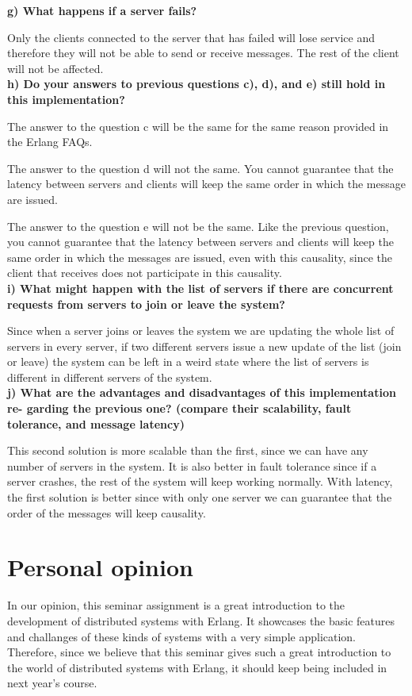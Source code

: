 \documentclass[a4paper, 10pt]{article}
\begin{document}
\textbf{g) What happens if a server fails?}

Only the clients connected to the server that has failed will lose service and therefore they will not be able to send or receive messages. The rest of the client will not be affected.\\

\textbf{h) Do your answers to previous questions c), d), and e) still hold in this
implementation?}

The answer to the question c will be the same for the same reason provided in the Erlang FAQs.

The answer to the question d will not the same. You cannot guarantee that the latency between servers and clients will keep the same order in which the message are issued.

The answer to the question e will not be the same. Like the previous question, you cannot guarantee that the latency between servers and clients will keep the same order in which the messages are issued, even with this causality, since the client that receives does not participate in this causality.\\


\textbf{i) What might happen with the list of servers if there are concurrent requests
from servers to join or leave the system?}

Since when a server joins or leaves the system we are updating the whole list of servers in every server, if two different servers issue a new update of the list (join or leave) the system can be left in a weird state where the list of servers is different in different servers of the system.\\

\textbf{j) What are the advantages and disadvantages of this implementation re-
garding the previous one? (compare their scalability, fault tolerance, and
message latency)}

This second solution is more scalable than the first, since we can have any number of servers in the system. It is also better in fault tolerance since if a server crashes, the rest of the system will keep working normally. With latency, the first solution is better since with only one server we can guarantee that the order of the messages will keep causality.

\section{Personal opinion}

In our opinion, this seminar assignment is a great introduction to the
development of distributed systems with Erlang. It showcases the basic features
and challanges of these kinds of systems with a very simple application.
Therefore, since we believe that this seminar gives such a great introduction to
the world of distributed systems with Erlang, it should keep being included in
next year's course.
\end{document}
